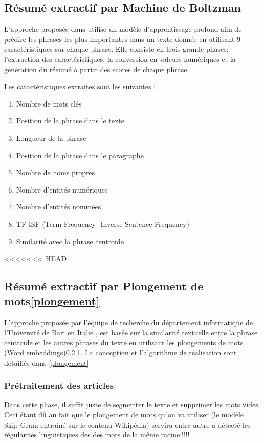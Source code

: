     \subsection{Résumé extractif par Machine de Boltzman}
    L'approche proposée dans \cite{boltzman} utilise un modèle d'apprentissage profond afin de prédire les phrases les plus importantes dans un texte donnée en utilisant 9 caractéristiques sur chaque phrase. Elle consiste en trois grande phases: l'extraction des caractéristiques, la conversion en valeurs numériques et la génération du résumé à partir des scores de chaque phrase. 

    Les caractéristiques extraites sont les suivantes :
    \begin{enumerate}
        \item{Nombre de mots clés}
        \item{Position de la phrase dans le texte}
        \item{Longueur de la phrase}
        \item{Position de la phrase dans le paragraphe}
        \item{Nombre de noms propres}
        \item{Nombre d'entités numériques}
        \item{Nombre d'entités nommées}
        \item{TF-ISF (Term Frequency- Inverse Sentence Frequency)}
        \item{Similarité avec la phrase centroïde}
    \end{enumerate} 

<<<<<<< HEAD
    \subsection{Résumé extractif par Plongement de mots\ref{plongement}}
    L'approche proposée par l'équipe de recherche du département informatique de l'Université de Bari en Italie \cite{bari}, est basée sur la similarité textuelle entre la phrase centroïde et les autres phrases du texte en utilisant les plongements de mots (Word embeddings)\ref{}. La conception et l'algorithme de réalisation sont détaillés dans \ref{plongement}

        \subsubsection{Prétraitement des articles}
        Dans cette phase, il suffit juste de segmenter le texte et supprimer les mots vides. Ceci étant dû au fait que le plongement de mots qu'on va utiliser (le modèle Skip-Gram entraîné sur le contenu Wikipédia) servira entre autre a détecté les régularités linguistiques des des mots de la même racine.!!!!


